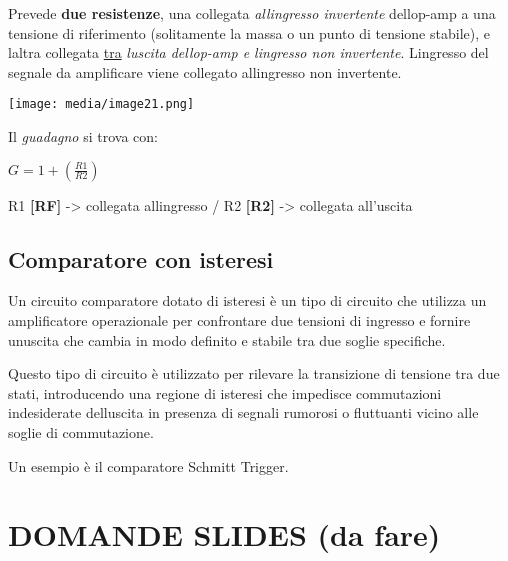 Prevede \textbf{due resistenze}, una collegata
\emph{all\textquotesingle ingresso invertente}
dell\textquotesingle op-amp a una tensione di riferimento (solitamente
la massa o un punto di tensione stabile), e l\textquotesingle altra
collegata \ul{tra} \emph{l\textquotesingle uscita
dell\textquotesingle op-amp e l\textquotesingle ingresso non
invertente}. L\textquotesingle ingresso del segnale da amplificare viene
collegato all\textquotesingle ingresso non invertente.

\texttt{[image: media/image21.png]}

Il \emph{guadagno} si trova con:

\(G = 1 + (\frac{R1}{R2})\)

R1 \textbf{{[}RF{]}} -\textgreater{} collegata
all\textquotesingle ingresso / R2 \textbf{{[}R2{]}} -\textgreater{}
collegata all'uscita

\subsection{Comparatore con isteresi}\label{comparatore-con-isteresi}

Un circuito comparatore dotato di isteresi è un tipo di circuito che
utilizza un amplificatore operazionale per confrontare due tensioni di
ingresso e fornire un\textquotesingle uscita che cambia in modo definito
e stabile tra due soglie specifiche.

Questo tipo di circuito è utilizzato per rilevare la transizione di
tensione tra due stati, introducendo una regione di isteresi che
impedisce commutazioni indesiderate dell\textquotesingle uscita in
presenza di segnali rumorosi o fluttuanti vicino alle soglie di
commutazione.

Un esempio è il comparatore Schmitt Trigger.

\section{DOMANDE SLIDES (da fare)}\label{domande-slides-da-fare}
